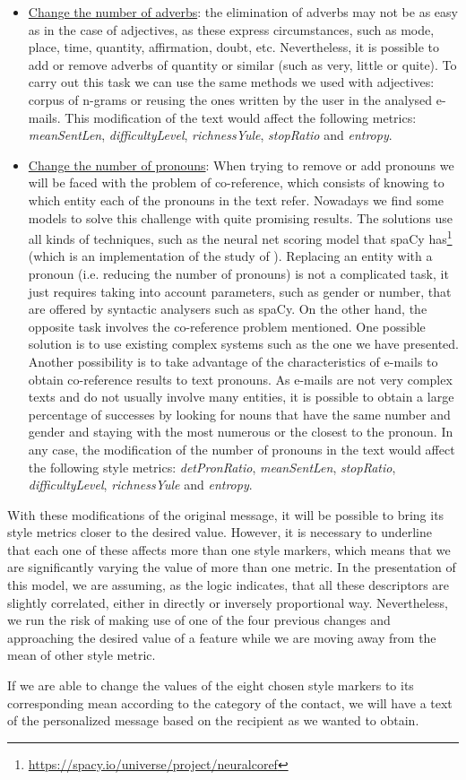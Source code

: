 \begin{itemize}
	\item\underline{Change the number of adverbs}: the elimination of adverbs may not be as easy as in the case of adjectives, as these express circumstances, such as mode, place, time, quantity, affirmation, doubt, etc. Nevertheless, it is possible to add or remove adverbs of quantity or similar (such as very, little or quite). To carry out this task we can use the same methods we used with adjectives: corpus of n-grams or reusing the ones written by the user in the analysed e-mails. This modification of the text would affect the following metrics: \textit{meanSentLen}, \textit{difficultyLevel}, \textit{richnessYule}, \textit{stopRatio} and \textit{entropy}.
	
	\item\underline{Change the number of pronouns}: When trying to remove or add pronouns we will be faced with the problem of co-reference, which consists of knowing to which entity each of the pronouns in the text refer. Nowadays we find some models to solve this challenge with quite promising results. The solutions use all kinds of techniques, such as the neural net scoring model that spaCy has\footnote{\url{https://spacy.io/universe/project/neuralcoref}} (which is an implementation of the study of \cite{clark2016deep}). Replacing an entity with a pronoun (i.e. reducing the number of pronouns) is not a complicated task, it just requires taking into account parameters, such as gender or number, that are offered by syntactic analysers such as spaCy. On the other hand, the opposite task involves the co-reference problem mentioned. One possible solution is to use existing complex systems such as the one we have presented. Another possibility is to take advantage of the characteristics of e-mails to obtain co-reference results to text pronouns. As e-mails are not very complex texts and do not usually involve many entities, it is possible to obtain a large percentage of successes by looking for nouns that have the same number and gender and staying with the most numerous or the closest to the pronoun. In any case, the modification of the number of pronouns in the text would affect the following style metrics: \textit{detPronRatio}, \textit{meanSentLen}, \textit{stopRatio}, \textit{difficultyLevel}, \textit{richnessYule} and \textit{entropy}.
\end{itemize}

With these modifications of the original message, it will be possible to bring its style metrics closer to the desired value. However, it is necessary to underline that each one of these affects more than one style markers, which means that we are significantly varying the value of more than one metric. In the presentation of this model, we are assuming, as the logic indicates, that all these descriptors are slightly correlated, either in directly or inversely proportional way. Nevertheless, we run the risk of making use of one of the four previous changes and approaching the desired value of a feature while we are moving away from the mean of other style metric.

If we are able to change the values of the eight chosen style markers to its corresponding mean according to the category of the contact, we will have a text of the personalized message based on the recipient as we wanted to obtain.